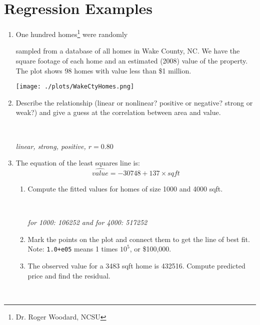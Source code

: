 \def\theTopic{Regression Examples }
\def\dayNum{19 }

\section{ Regression Examples}

\begin{enumerate}
\item One hundred homes\footnote{Dr. Roger
    Woodard, NCSU } were randomly \vspace{-.24in}\\ 
  \begin{minipage}{.35\linewidth} 
  sampled from a database of all
  homes in Wake County, NC.  We
  have the square footage of each home and an estimated (2008) value of
  the property.  The plot shows 98 homes with value less than \$1
  million.  \vspace*{1in}
  \end{minipage}\hfill
  \begin{minipage}{.60\linewidth}
    \texttt{[image: ./plots/WakeCtyHomes.png]}
  \end{minipage}
  \item  Describe the relationship (linear or nonlinear? positive or
    negative? strong or weak?) and give a guess at the correlation
    between area and value.
\begin{students}
 \vspace{2cm}\\
\end{students}

\begin{key}
  {\it linear, strong, positive, $r = 0.80$ }
\end{key}

  \item The equation of the least squares line is:
  $$  \widehat{value} =  -30748 + 137\times{sqft}$$
  \begin{enumerate}
  \item Compute the fitted values for homes of size 1000 and 4000 sqft.
\begin{students}
 \vspace{2cm}\\
\end{students}

\begin{key}
  {\it  for 1000: 106252  and for 4000: 517252 }
\end{key}
   \item  Mark the points on the plot and connect them to get the line
     of best fit.  \\
      Note: \verb|1.0+e05| means 1 times $10^5$, or \$100,000.  \vspace{.1in}
   \item The observed value for a 3483 sqft home is  432516.
     Compute predicted price and find the  residual.
\begin{students}
 \vspace{2cm}\\
\end{students}


\end{enumerate}
\end{enumerate}
